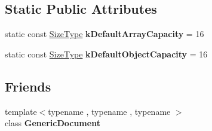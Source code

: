 \subsection*{Static Public Attributes}
\begin{DoxyCompactItemize}
\item 
static const \hyperlink{a00677_a5ed6e6e67250fadbd041127e6386dcb5}{Size\+Type} {\bfseries k\+Default\+Array\+Capacity} = 16\hypertarget{a00130_a188f57bdb1923c1fefe74baa995871a3}{}\label{a00130_a188f57bdb1923c1fefe74baa995871a3}

\item 
static const \hyperlink{a00677_a5ed6e6e67250fadbd041127e6386dcb5}{Size\+Type} {\bfseries k\+Default\+Object\+Capacity} = 16\hypertarget{a00130_a284d018914629aed9a4bd97fe2dc5899}{}\label{a00130_a284d018914629aed9a4bd97fe2dc5899}

\end{DoxyCompactItemize}
\subsection*{Friends}
\begin{DoxyCompactItemize}
\item 
{\footnotesize template$<$typename , typename , typename $>$ }\\class {\bfseries Generic\+Document}\hypertarget{a00130_ab05bc9e52e201a2867ea5bac141ee1ae}{}\label{a00130_ab05bc9e52e201a2867ea5bac141ee1ae}

\end{DoxyCompactItemize}
